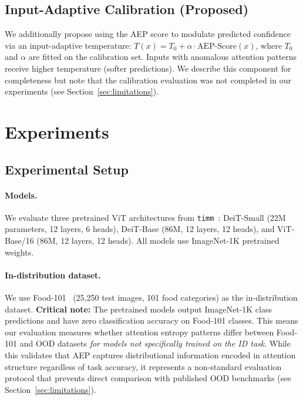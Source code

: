 \documentclass{article}
\newcommand{\AEP}{\textsc{AEP}}
\begin{document}
\subsection{Input-Adaptive Calibration (Proposed)}

We additionally propose using the AEP score to modulate predicted confidence via an input-adaptive temperature: $T(x) = T_0 + \alpha \cdot \text{AEP-Score}(x)$, where $T_0$ and $\alpha$ are fitted on the calibration set. Inputs with anomalous attention patterns receive higher temperature (softer predictions). We describe this component for completeness but note that the calibration evaluation was not completed in our experiments (see Section~\ref{sec:limitations}).

\section{Experiments}
\label{sec:experiments}

\subsection{Experimental Setup}
\label{sec:setup}

\paragraph{Models.} We evaluate three pretrained ViT architectures from \texttt{timm}~\citep{touvron2021training,dosovitskiy2021an}: DeiT-Small (22M parameters, 12 layers, 6 heads), DeiT-Base (86M, 12 layers, 12 heads), and ViT-Base/16 (86M, 12 layers, 12 heads). All models use ImageNet-1K pretrained weights.

\paragraph{In-distribution dataset.} We use Food-101~\citep{bossard2014food} (25,250 test images, 101 food categories) as the in-distribution dataset. \textbf{Critical note:} The pretrained models output ImageNet-1K class predictions and have zero classification accuracy on Food-101 classes. This means our evaluation measures whether attention entropy patterns differ between Food-101 and OOD datasets \emph{for models not specifically trained on the ID task}. While this validates that \AEP{} captures distributional information encoded in attention structure regardless of task accuracy, it represents a non-standard evaluation protocol that prevents direct comparison with published OOD benchmarks (see Section~\ref{sec:limitations}).
\end{document}
